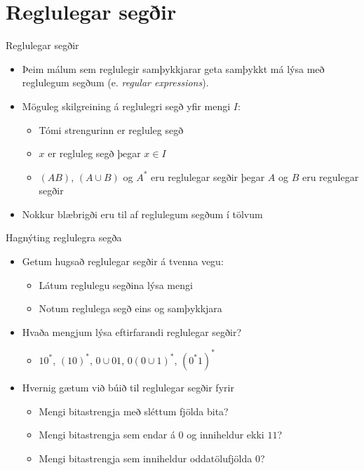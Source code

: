 \documentclass[handout]{beamer}
\begin{document}
\section{Reglulegar segðir}

\begin{frame}{Reglulegar segðir}
    \begin{itemize}
        \item Þeim málum sem reglulegir samþykkjarar geta samþykkt má lýsa með reglulegum segðum (e. \emph{regular expressions}).
        \item Möguleg skilgreining á reglulegri segð yfir mengi $I$:
        \begin{itemize}
            \item Tómi strengurinn er regluleg segð
            \item $x$ er regluleg segð þegar $x \in I$
            \item $(AB)$, $(A \cup B)$ og $A^*$ eru reglulegar segðir þegar $A$ og $B$ eru regulegar segðir
        \end{itemize}
        \item Nokkur blæbrigði eru til af reglulegum segðum í tölvum
    \end{itemize}
\end{frame}

\begin{frame}{Hagnýting reglulegra segða}
    \begin{itemize}
        \item Getum hugsað reglulegar segðir á tvenna vegu:
        \begin{itemize}
            \item Látum reglulegu segðina lýsa mengi
            \item Notum reglulega segð eins og samþykkjara
        \end{itemize}
        \item Hvaða mengjum lýsa eftirfarandi reglulegar segðir?
        \begin{itemize}
            \item $10^*$, $(10)^*$, $0 \cup 01$, $0(0 \cup 1)^*$, $(0^*1)^*$
        \end{itemize}
        \item Hvernig gætum við búið til reglulegar segðir fyrir
        \begin{itemize}
            \item Mengi bitastrengja með sléttum fjölda bita?
            \item Mengi bitastrengja sem endar á $0$ og inniheldur ekki $11$?
            \item Mengi bitastrengja sem inniheldur oddatölufjölda 0?
        \end{itemize}
    \end{itemize}
\end{frame}
\end{document}
